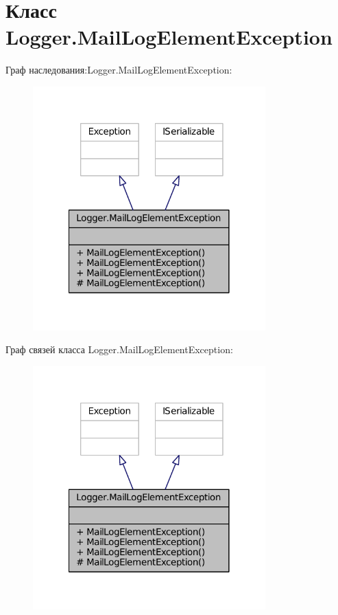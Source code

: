 \hypertarget{class_logger_1_1_mail_log_element_exception}{}\section{Класс Logger.\+Mail\+Log\+Element\+Exception}
\label{class_logger_1_1_mail_log_element_exception}


Граф наследования\+:Logger.\+Mail\+Log\+Element\+Exception\+:
\nopagebreak
\begin{figure}[H]
\begin{center}
\leavevmode
\includegraphics[width=254pt]{class_logger_1_1_mail_log_element_exception__inherit__graph}
\end{center}
\end{figure}


Граф связей класса Logger.\+Mail\+Log\+Element\+Exception\+:
\nopagebreak
\begin{figure}[H]
\begin{center}
\leavevmode
\includegraphics[width=254pt]{class_logger_1_1_mail_log_element_exception__coll__graph}
\end{center}
\end{figure}
